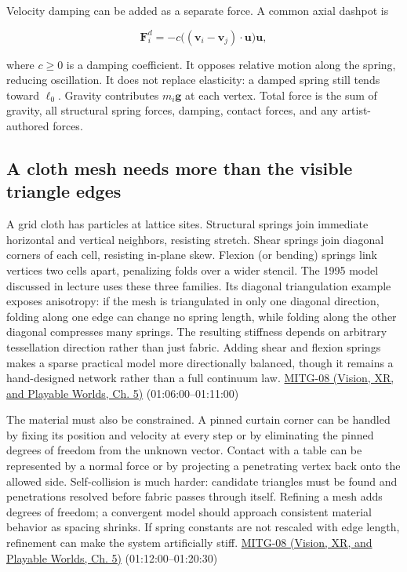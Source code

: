 Velocity damping can be added as a separate force. A common axial dashpot is

\[
\boldsymbol{F}^{d}_i=-c\big((\boldsymbol{v}_i-\boldsymbol{v}_j)\cdot\boldsymbol{u}\big)\boldsymbol{u},
\]

where \(c\ge0\) is a damping coefficient. It opposes relative motion along the spring, reducing oscillation. It does not replace elasticity: a damped spring still tends toward \(\ell_0\). Gravity contributes \(m_i\boldsymbol{g}\) at each vertex. Total force is the sum of gravity, all structural spring forces, damping, contact forces, and any artist-authored forces.

\subsection{A cloth mesh needs more than the visible triangle edges}\label{04-visual-computing-ii-ch029-a-cloth-mesh-needs-more-than-the-visible-triangle-edges}

A grid cloth has particles at lattice sites. Structural springs join immediate horizontal and vertical neighbors, resisting stretch. Shear springs join diagonal corners of each cell, resisting in-plane skew. Flexion (or bending) springs link vertices two cells apart, penalizing folds over a wider stencil. The 1995 model discussed in lecture uses these three families. Its diagonal triangulation example exposes anisotropy: if the mesh is triangulated in only one diagonal direction, folding along one edge can change no spring length, while folding along the other diagonal compresses many springs. The resulting stiffness depends on arbitrary tessellation direction rather than just fabric. Adding shear and flexion springs makes a sparse practical model more directionally balanced, though it remains a hand-designed network rather than a full continuum law. \href{../07-Vision-XR-and-Playable-Worlds/main.pdf\#nameddest=04-visual-computing-ii-ch036-mitg-08---cloth-simulation}{MITG-08 (Vision, XR, and Playable Worlds, Ch. 5)} (01:06:00--01:11:00)

The material must also be constrained. A pinned curtain corner can be handled by fixing its position and velocity at every step or by eliminating the pinned degrees of freedom from the unknown vector. Contact with a table can be represented by a normal force or by projecting a penetrating vertex back onto the allowed side. Self-collision is much harder: candidate triangles must be found and penetrations resolved before fabric passes through itself. Refining a mesh adds degrees of freedom; a convergent model should approach consistent material behavior as spacing shrinks. If spring constants are not rescaled with edge length, refinement can make the system artificially stiff. \href{../07-Vision-XR-and-Playable-Worlds/main.pdf\#nameddest=04-visual-computing-ii-ch036-mitg-08---cloth-simulation}{MITG-08 (Vision, XR, and Playable Worlds, Ch. 5)} (01:12:00--01:20:30)

